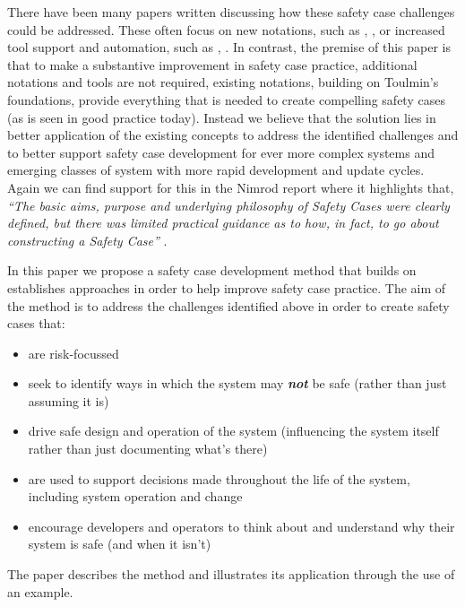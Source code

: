 There have been many papers written discussing how these safety case challenges could be addressed. These often focus on new notations, such as \cite{goodenough2015eliminative}, \cite{holloway2023friendly}, or increased tool support and automation, such as \cite{denney2012advocate}, \cite{matsuno2010dependability}. In contrast, the premise of this paper is that to make a substantive improvement in safety case practice, additional notations and tools are not required, existing notations, building on Toulmin's foundations, provide everything that is needed to create compelling safety cases (as is seen in good practice today). Instead we believe that the solution lies in better application of the existing concepts to address the identified challenges and to better support safety case development for ever more complex systems and emerging classes of system with more rapid development and update cycles. Again we can find support for this in the Nimrod report where it highlights that, \textit{``The basic aims, purpose and underlying philosophy of Safety Cases were clearly defined, but there was limited practical guidance as to how, in fact, to go about constructing a Safety Case''} \cite{qc2009nimrod}.

In this paper we propose a safety case development method that builds on establishes approaches in order to help improve safety case practice. The aim of the method is to address the challenges identified above in order to create safety cases that:
\begin{itemize}
    \item are risk-focussed
    \item seek to identify ways in which the system may \textbf{\textit{not}} be safe (rather than just assuming it is)
    \item drive safe design and operation of the system (influencing the system itself rather than just documenting what's there) \cite{graydon2007assurance}
    \item are used to support decisions made throughout the life of the system, including system operation and change \cite{kelly2001systematic}
    \item encourage developers and operators to think about and understand why their system is safe (and when it isn't)
\end{itemize}

The paper describes the method and illustrates its application through the use of an example.


